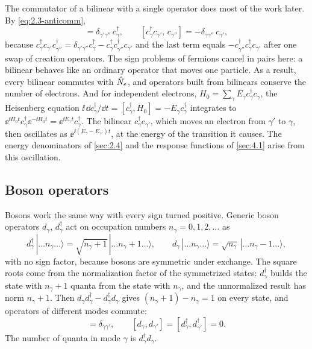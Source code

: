 The commutator of a bilinear with a single operator does most of the work later. By \cref{eq:2.3-anticomm},
\begin{equation}
  [c^\dagger_\gamma c_{\gamma'},\, c^\dagger_{\gamma''}] = \delta_{\gamma'\gamma''}\,c^\dagger_\gamma , \qquad
  [c^\dagger_\gamma c_{\gamma'},\, c_{\gamma''}] = -\delta_{\gamma\gamma''}\,c_{\gamma'} ,
  \label{eq:2.3-bilinear}
\end{equation}
because $c^\dagger_\gamma c_{\gamma'}c^\dagger_{\gamma''} = \delta_{\gamma'\gamma''}c^\dagger_\gamma - c^\dagger_\gamma c^\dagger_{\gamma''}c_{\gamma'}$ and the last term equals $-c^\dagger_{\gamma''}c^\dagger_\gamma c_{\gamma'}$ after one swap of creation operators. The sign problems of fermions cancel in pairs here: a bilinear behaves like an ordinary operator that moves one particle. As a result, every bilinear commutes with $\hat{N}_e$, and operators built from bilinears conserve the number of electrons. And for independent electrons, $H_0 = \sum_\gamma E_\gamma c^\dagger_\gamma c_\gamma$, the Heisenberg equation $\ii\,\dd c^\dagger_\gamma/\dd t = [c^\dagger_\gamma, H_0] = -E_\gamma c^\dagger_\gamma$ integrates to $\ee^{\ii H_0t}c^\dagger_\gamma\ee^{-\ii H_0t} = \ee^{\ii E_\gamma t}c^\dagger_\gamma$. The bilinear $c^\dagger_\gamma c_{\gamma'}$, which moves an electron from $\gamma'$ to $\gamma$, then oscillates as $\ee^{\ii(E_\gamma - E_{\gamma'})t}$, at the energy of the transition it causes. The energy denominators of \cref{sec:2.4} and the response functions of \cref{sec:4.1} arise from this oscillation.

\subsection{Boson operators}

Bosons work the same way with every sign turned positive. Generic boson operators $d_\gamma$, $d^\dagger_\gamma$ act on occupation numbers $n_\gamma = 0, 1, 2, \dots$ as
\begin{equation}
  d^\dagger_\gamma\,|\dots n_\gamma\dots\rangle = \sqrt{n_\gamma + 1}\,|\dots n_\gamma + 1\dots\rangle, \qquad
  d_\gamma\,|\dots n_\gamma\dots\rangle = \sqrt{n_\gamma}\,|\dots n_\gamma - 1\dots\rangle ,
  \label{eq:2.3-boson}
\end{equation}
with no sign factor, because bosons are symmetric under exchange. The square roots come from the normalization factor of the symmetrized states: $d^\dagger_\gamma$ builds the state with $n_\gamma + 1$ quanta from the state with $n_\gamma$, and the unnormalized result has norm $n_\gamma + 1$. Then $d_\gamma d^\dagger_\gamma - d^\dagger_\gamma d_\gamma$ gives $(n_\gamma + 1) - n_\gamma = 1$ on every state, and operators of different modes commute:
\begin{equation}
  [d_\gamma, d^\dagger_{\gamma'}] = \delta_{\gamma\gamma'}, \qquad [d_\gamma, d_{\gamma'}] = [d^\dagger_\gamma, d^\dagger_{\gamma'}] = 0 .
  \label{eq:2.3-comm}
\end{equation}
The number of quanta in mode $\gamma$ is $d^\dagger_\gamma d_\gamma$.

